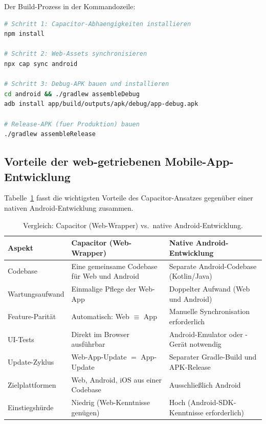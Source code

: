 ﻿\documentclass[12pt,a4paper]{article}
\begin{document}
Der Build-Prozess in der Kommandozeile:

\begin{lstlisting}[language=bash, caption={EHAE-Android-App: Build-Ablauf.}]
# Schritt 1: Capacitor-Abhaengigkeiten installieren
npm install

# Schritt 2: Web-Assets synchronisieren
npx cap sync android

# Schritt 3: Debug-APK bauen und installieren
cd android && ./gradlew assembleDebug
adb install app/build/outputs/apk/debug/app-debug.apk

# Release-APK (fuer Produktion) bauen
./gradlew assembleRelease
\end{lstlisting}

\subsection{Vorteile der web-getriebenen Mobile-App-Entwicklung}

Tabelle~\ref{tab:capacitor_advantages} fasst die wichtigsten Vorteile des
Capacitor-Ansatzes gegenüber einer nativen Android-Entwicklung zusammen.

\begin{table}[H]
\centering
\caption{Vergleich: Capacitor (Web-Wrapper) vs.\ native Android-Entwicklung.}
\label{tab:capacitor_advantages}
\begin{tabularx}{\textwidth}{lXX}
\toprule
\textbf{Aspekt} & \textbf{Capacitor (Web-Wrapper)} & \textbf{Native Android-Entwicklung} \\
\midrule
Codebase           & Eine gemeinsame Codebase für Web und Android
                   & Separate Android-Codebase (Kotlin/Java) \\
Wartungsaufwand    & Einmalige Pflege der Web-App
                   & Doppelter Aufwand (Web und Android) \\
Feature-Parität    & Automatisch: Web $\equiv$ App
                   & Manuelle Synchronisation erforderlich \\
UI-Tests           & Direkt im Browser ausführbar
                   & Android-Emulator oder -Gerät notwendig \\
Update-Zyklus      & Web-App-Update $=$ App-Update
                   & Separater Gradle-Build und APK-Release \\
Zielplattformen    & Web, Android, iOS aus einer Codebase
                   & Ausschlie\ss{}lich Android \\
Einstiegshürde     & Niedrig (Web-Kenntnisse genügen)
                   & Hoch (Android-SDK-Kenntnisse erforderlich) \\
\bottomrule
\end{tabularx}
\end{table}
\end{document}

